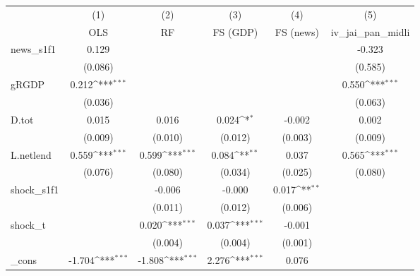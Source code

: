 {
\def\sym#1{\ifmmode^{#1}\else\(^{#1}\)\fi}
\begin{tabular}{l*{5}{c}}
\toprule
            &\multicolumn{1}{c}{(1)}&\multicolumn{1}{c}{(2)}&\multicolumn{1}{c}{(3)}&\multicolumn{1}{c}{(4)}&\multicolumn{1}{c}{(5)}\\
            &\multicolumn{1}{c}{OLS}&\multicolumn{1}{c}{RF}&\multicolumn{1}{c}{FS (GDP)}&\multicolumn{1}{c}{FS (news)}&\multicolumn{1}{c}{iv\_jai\_pan\_midli}\\
\midrule
news\_s1f1   &       0.129         &                     &                     &                     &      -0.323         \\
            &     (0.086)         &                     &                     &                     &     (0.585)         \\
\addlinespace
gRGDP       &       0.212\sym{***}&                     &                     &                     &       0.550\sym{***}\\
            &     (0.036)         &                     &                     &                     &     (0.063)         \\
\addlinespace
D.tot       &       0.015         &       0.016         &       0.024\sym{*}  &      -0.002         &       0.002         \\
            &     (0.009)         &     (0.010)         &     (0.012)         &     (0.003)         &     (0.009)         \\
\addlinespace
L.netlend   &       0.559\sym{***}&       0.599\sym{***}&       0.084\sym{**} &       0.037         &       0.565\sym{***}\\
            &     (0.076)         &     (0.080)         &     (0.034)         &     (0.025)         &     (0.080)         \\
\addlinespace
shock\_s1f1  &                     &      -0.006         &      -0.000         &       0.017\sym{**} &                     \\
            &                     &     (0.011)         &     (0.012)         &     (0.006)         &                     \\
\addlinespace
shock\_t     &                     &       0.020\sym{***}&       0.037\sym{***}&      -0.001         &                     \\
            &                     &     (0.004)         &     (0.004)         &     (0.001)         &                     \\
\addlinespace
\_cons      &      -1.704\sym{***}&      -1.808\sym{***}&       2.276\sym{***}&       0.076         &                     \\

\end{tabular}}
